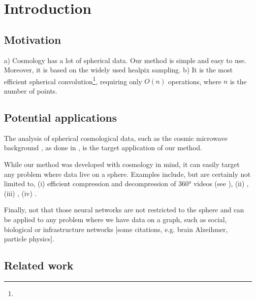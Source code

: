 \documentclass[preprint,12pt,authoryear]{elsarticle}
\newcommand{\todo}[1]{{\color[rgb]{.6,.1,.6}{#1}}}
\newcommand{\assign}[1]{{\color[rgb]{.8,.5,.8}{Assigned: #1 }}}
\begin{document}

\section{Introduction}
\label{sec:intro}




\subsection{Motivation}
\assign{Tomek}

a) Cosmology has a lot of spherical data. Our method is simple and easy to use. Moreover, it is based on the widely used healpix sampling.
b) It is the most efficient spherical convolution\footnote{\todo{provably? cannot be faster than O(n) without approximations, e.g. sketching}}, requiring only $O(n)$ operations, where $n$ is the number of points.

\subsection{Potential applications}
	\assign{Tomek, Nathanael, Michael}

The analysis of spherical cosmological data, such as the cosmic microwave background \cite{...}, as done in \cite{he2018analysis}, is the target application of our method.

While our method was developed with cosmology in mind, it can easily target any problem where data live on a sphere. Examples include, but are certainly not limited to, (i) efficient compression and decompression of \ang{360} videos (see \cite{su2017learning}), (ii) \todo{data analysis on planets? (climate, forecasting, temperature, wind)}, (iii) \todo{particle physics? (jets on detectors, but they are usually cylindrical)}, (iv) \todo{applications in Cohen's papers?}.

Finally, not that those neural networks are not restricted to the sphere and can be applied to any problem where we have data on a graph, such as social, biological or infrastructure networks [some citations, e.g. brain Alzeihmer, particle physics].

\subsection{Related work}
\assign{Nathanael, Michael}
\label{sec:related}
\cite{cohen2017convolutional} 
\cite{cohen2018spherical}
\cite{boomsma2017spherical}
\cite{defferrard2016convolutional}
\end{document}
